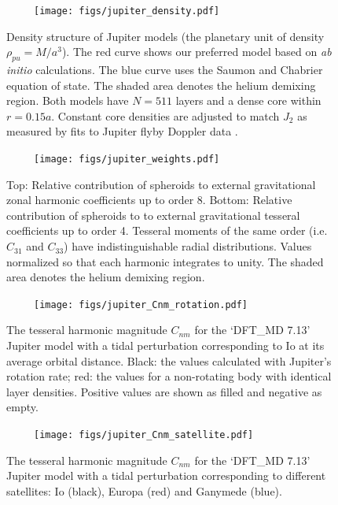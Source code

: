 \begin{figure}[h!]  
  \centering
    \texttt{[image: figs/jupiter\_density.pdf]}
\caption{   Density structure of Jupiter models (the planetary unit of
density $\rho_{pu}=M/a^3$).  The red curve shows our preferred
    model based on \textit{ab initio} calculations. The blue curve uses the Saumon and
    Chabrier equation of state. The shaded area denotes the helium demixing region.
    Both models have $N=511$ layers and a dense core within $r=0.15a$.  Constant core
    densities are adjusted to match $J_2$ as measured by fits to Jupiter flyby Doppler
    data \citep{jacobson2003}.}
\label{fig:density_structure}
\end{figure}

\begin{figure}[h!]  
  \centering
    \texttt{[image: figs/jupiter\_weights.pdf]}
\caption{Top: Relative contribution of spheroids to external gravitational zonal
    harmonic coefficients up to order 8. Bottom: Relative contribution of spheroids
    to to external gravitational tesseral coefficients up to order 4. Tesseral
    moments of the same order (i.e. $C_{31}$ and $C_{33}$) have indistinguishable
radial distributions. Values normalized so that each harmonic integrates to unity.
The shaded area denotes the helium demixing region.  }
\label{fig:jupiter_weights}
\end{figure}

\begin{figure}[h!]  
  \centering
    \texttt{[image: figs/jupiter\_Cnm\_rotation.pdf]}
\caption{ The tesseral harmonic magnitude $C_{nm}$ for the `DFT\_MD 7.13' Jupiter
model with a tidal perturbation corresponding to Io at its average orbital distance.
Black: the values calculated with Jupiter's rotation rate; red: the values for
a non-rotating body with identical layer densities.  Positive values are shown as
filled and negative as empty.}
\label{fig:tesseral_rotation}
\end{figure}

\begin{figure}[h!]  
  \centering
    \texttt{[image: figs/jupiter\_Cnm\_satellite.pdf]}
\caption{ The tesseral harmonic magnitude $C_{nm}$ for the `DFT\_MD 7.13' Jupiter
model with a tidal perturbation corresponding to different satellites: Io (black),
Europa (red) and Ganymede (blue).}
\label{fig:tesseral_satellites}
\end{figure}

